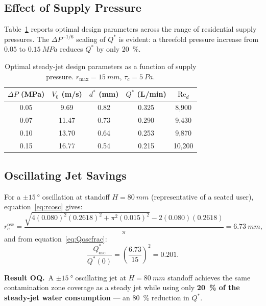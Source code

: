 \documentclass[aps,prfluids,reprint,amsmath,amssymb,floatfix]{revtex4-2}
\newcommand{\Rey}{\mathrm{Re}}
\begin{document}
\subsection{Effect of Supply Pressure}
\label{subsec:pressure_sensitivity}

Table~\ref{tab:pressure} reports optimal design parameters across the
range of residential supply pressures. The $\Delta P^{-1/6}$ scaling
of $Q^*$ is evident: a threefold pressure increase from $0.05$ to
$\SI{0.15}{MPa}$ reduces $Q^*$ by only \SI{20}{\percent}.

\begin{table}[H]
\centering
\caption{Optimal steady-jet design parameters as a function of supply
pressure. $r_\mathrm{max} = \SI{15}{mm}$, $\tau_c = \SI{5}{Pa}$.}
\label{tab:pressure}
\renewcommand{\arraystretch}{1.3}
\begin{tabular}{ccccc}
\toprule
$\Delta P$ (MPa) & $V_0$ (m/s) & $d^*$ (mm) & $Q^*$ (L/min)
  & $\Rey_d$ \\
\midrule
0.05 & 9.69  & 0.82 & 0.325 & 8{,}900 \\
0.07 & 11.47 & 0.73 & 0.290 & 9{,}430 \\
0.10 & 13.70 & 0.64 & 0.253 & 9{,}870 \\
0.15 & 16.77 & 0.54 & 0.215 & 10{,}200 \\
\bottomrule
\end{tabular}
\end{table}

\subsection{Oscillating Jet Savings}
\label{subsec:osc_results}

For a $\pm\SI{15}{\degree}$ oscillation at standoff $H = \SI{80}{mm}$
(representative of a seated user), equation~\eqref{eq:rcosc} gives:
\begin{equation}
  r_c^\mathrm{osc} = \frac{\sqrt{4(0.080)^2(0.2618)^2 + \pi^2(0.015)^2}
  - 2(0.080)(0.2618)}{\pi}
  = \SI{6.73}{mm},
\end{equation}
and from equation~\eqref{eq:Qoscfrac}:
\begin{equation}
  \frac{Q_\mathrm{osc}^*}{Q^*(0)}
  = \left(\frac{6.73}{15}\right)^2 = 0.201.
\end{equation}

\begin{mdframed}[style=resultbox]
\textbf{Result OQ.}\ A $\pm\SI{15}{\degree}$ oscillating jet at
$H = \SI{80}{mm}$ standoff achieves the same contamination zone
coverage as a steady jet while using only \textbf{\SI{20}{\percent}
of the steady-jet water consumption} --- an \SI{80}{\percent}
reduction in $Q^*$.
\end{mdframed}
\end{document}
